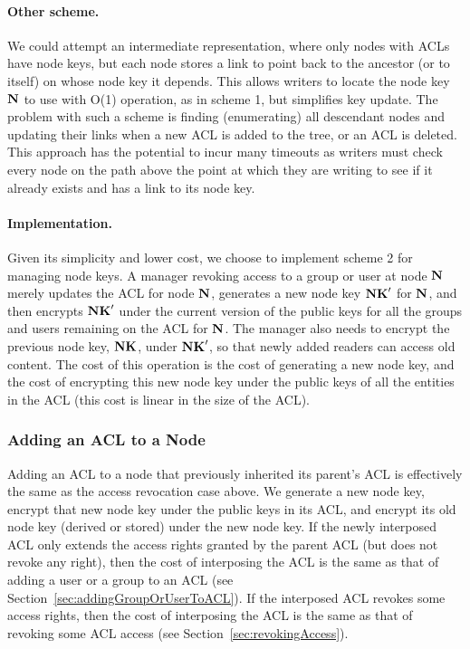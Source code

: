 \paragraph{Other scheme.}
We could attempt an intermediate representation, where only nodes with
ACLs have node keys, but each node stores a link to point back to the
ancestor (or to itself) on whose node key it depends. This allows
writers to locate the node key ${\textbf{N}}$ to use with O(1) operation, as in
scheme 1, but simplifies key update. The problem with such a scheme is
finding (enumerating) all descendant nodes and updating their links
when a new ACL is added to the tree, or an ACL is deleted. This
approach has the potential to incur many timeouts as writers must
check every node on the path above the point at which they are writing
to see if it already exists and has a link to its node key.

\paragraph{Implementation.}
Given its simplicity and lower cost, we choose to implement scheme 2
for managing node keys. A manager revoking access to a group or user
at node ${\textbf{N}}$ merely updates the ACL for node ${\textbf{N}}$, generates a new
node key ${\textbf{NK}}'$ for ${\textbf{N}}$, and then encrypts ${\textbf{NK}}'$ under the current
version of the public keys for all the groups and users remaining on
the ACL for ${\textbf{N}}$. The manager also needs to encrypt the previous node
key, ${\textbf{NK}}$, under ${\textbf{NK}}'$, so that newly added readers can access old
content. The cost of this operation is the cost of generating a new
node key, and the cost of encrypting this new node key under the
public keys of all the entities in the ACL (this cost is linear in the
size of the ACL).


\subsubsection{Adding an ACL to a Node}

Adding an ACL to a node that previously inherited its parent's ACL is
effectively the same as the access revocation case above. We generate
a new node key, encrypt that new node key under the public keys in its
ACL, and encrypt its old node key (derived or stored) under the new
node key. If the newly interposed ACL only extends the access rights
granted by the parent ACL (but does not revoke any right), then the
cost of interposing the ACL is the same as that of adding a user or a
group to an ACL (see Section~\ref{sec:addingGroupOrUserToACL}). If the
interposed ACL revokes some access rights, then the cost of
interposing the ACL is the same as that of revoking some ACL access
(see Section~\ref{sec:revokingAccess}).

